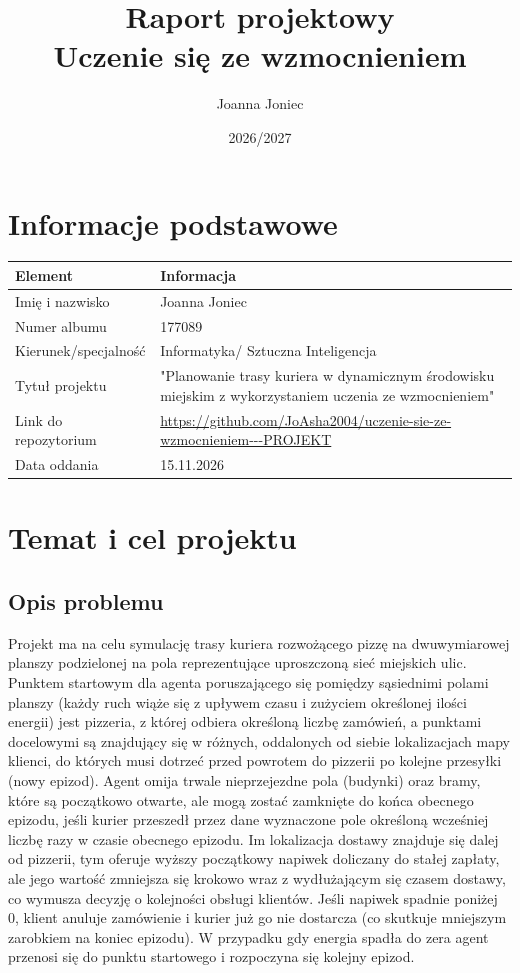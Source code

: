 \documentclass[12pt]{article}
\title{Raport projektowy\\Uczenie się ze wzmocnieniem}
\author{Joanna Joniec}
\date{2026/2027}
\begin{document}
\maketitle
\tableofcontents
\newpage

\section{Informacje podstawowe}

\begin{center}
\begin{tabular}{p{}p{}}
\toprule
Element & Informacja \\
\midrule
Imię i nazwisko & Joanna Joniec \\
Numer albumu & 177089 \\
Kierunek/specjalność & Informatyka/ Sztuczna Inteligencja \\
Tytuł projektu & "Planowanie trasy kuriera w dynamicznym środowisku miejskim z wykorzystaniem uczenia ze wzmocnieniem" \\
Link do repozytorium & \url{https://github.com/JoAsha2004/uczenie-sie-ze-wzmocnieniem---PROJEKT} \\
Data oddania & 15.11.2026 \\
\bottomrule
\end{tabular}
\end{center}

\section{Temat i cel projektu}

\subsection{Opis problemu}
Projekt ma na celu symulację trasy kuriera rozwożącego pizzę na dwuwymiarowej planszy podzielonej na pola reprezentujące uproszczoną sieć miejskich ulic.
Punktem startowym dla agenta poruszającego się pomiędzy sąsiednimi polami planszy (każdy ruch wiąże się z upływem czasu i zużyciem określonej ilości energii) jest pizzeria, z której odbiera określoną liczbę zamówień, a punktami docelowymi są znajdujący się w różnych, oddalonych od siebie lokalizacjach mapy klienci, do których musi dotrzeć przed powrotem do pizzerii po kolejne przesyłki (nowy epizod).
Agent omija trwale nieprzejezdne pola (budynki) oraz bramy, które są początkowo otwarte, ale mogą zostać zamknięte do końca obecnego epizodu, jeśli kurier przeszedł przez dane wyznaczone pole określoną wcześniej liczbę razy w czasie obecnego epizodu.
Im lokalizacja dostawy znajduje się dalej od pizzerii, tym oferuje wyższy początkowy napiwek doliczany do stałej zapłaty, ale jego wartość zmniejsza się krokowo wraz z wydłużającym się czasem dostawy, co wymusza decyzję o kolejności obsługi klientów. 
Jeśli napiwek spadnie poniżej 0, klient anuluje zamówienie i kurier już go nie dostarcza (co skutkuje mniejszym zarobkiem na koniec epizodu).
W przypadku gdy energia spadła do zera agent przenosi się do punktu startowego i rozpoczyna się kolejny epizod.
\end{document}
